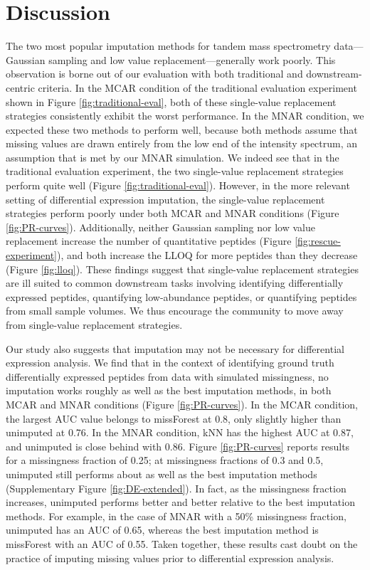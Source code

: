 \documentclass{article}
\begin{document}
\section{Discussion}

The two most popular imputation methods for tandem mass spectrometry data---Gaussian sampling and low value replacement---generally work poorly. This observation is borne out of our evaluation with both traditional and downstream-centric criteria. In the MCAR condition of the traditional evaluation experiment shown in Figure \ref{fig:traditional-eval}, both of these single-value replacement strategies consistently exhibit the worst performance. In the MNAR condition, we expected these two methods to perform well, because both methods assume that missing values are drawn entirely from the low end of the intensity spectrum, an assumption that is met by our MNAR simulation. We indeed see that in the traditional evaluation experiment, the two single-value replacement strategies perform quite well (Figure \ref{fig:traditional-eval}). However, in the more relevant setting of differential expression imputation, the single-value replacement strategies perform poorly under both MCAR and MNAR conditions (Figure \ref{fig:PR-curves}). Additionally, neither Gaussian sampling nor low value replacement increase the number of quantitative peptides (Figure \ref{fig:rescue-experiment}), and both increase the LLOQ for more peptides than they decrease (Figure \ref{fig:lloq}). These findings suggest that single-value replacement strategies are ill suited to common downstream tasks involving identifying differentially expressed peptides, quantifying low-abundance peptides, or quantifying peptides from small sample volumes. We thus encourage the community to move away from single-value replacement strategies. 

Our study also suggests that imputation may not be necessary for differential expression analysis. 
We find that in the context of identifying ground truth differentially expressed peptides from data with simulated missingness, no imputation works roughly as well as the best imputation methods, in both MCAR and MNAR conditions (Figure \ref{fig:PR-curves}). In the MCAR condition, the largest AUC value belongs to missForest at 0.8, only slightly higher than unimputed at 0.76. In the MNAR condition, kNN has the highest AUC at 0.87, and unimputed is close behind with 0.86. Figure \ref{fig:PR-curves} reports results for a missingness fraction of 0.25; at missingness fractions of 0.3 and 0.5, unimputed still performs about as well as the best imputation methods (Supplementary Figure \ref{fig:DE-extended}). In fact, as the missingness fraction increases, unimputed performs better and better relative to the best imputation methods.  For example, in the case of MNAR with a 50\% missingness fraction, unimputed has an AUC of 0.65, whereas the best imputation method is missForest with an AUC of 0.55. Taken together, these results cast doubt on the practice of imputing missing values prior to differential expression analysis. 
\end{document}
